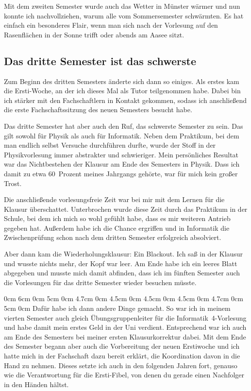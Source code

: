 \begin{multicols*}{2}
Mit dem zweiten Semester wurde auch das Wetter in Münster wärmer und nun konnte ich nachvollziehen, warum alle vom Sommersemester schwärmten. Es hat einfach ein besonderes Flair, wenn man sich nach der Vorlesung auf den Rasenflächen in der Sonne trifft oder abends am Aasee sitzt.

\subsection*{Das dritte Semester ist das schwerste}
Zum Beginn des dritten Semesters änderte sich dann so einiges. Als erstes kam die Ersti-Woche, an der ich dieses Mal als Tutor teilgenommen habe. Dabei bin ich stärker mit den Fachschaftlern in Kontakt gekommen, sodass ich anschließend die erste Fachschaftssitzung des neuen Semesters besucht habe.

Das dritte Semester hat aber auch den Ruf, das schwerste Semester zu sein. Das gilt sowohl für Physik als auch für Informatik. Neben dem Praktikum, bei dem man endlich selbst Versuche durchführen durfte, wurde der Stoff in der Physikvorlesung immer abstrakter und schwieriger. Mein persönliches Resultat war das Nichtbestehen der Klausur am Ende des Semesters in Physik. Dass ich damit zu etwa 60~Prozent meines Jahrgangs gehörte, war für mich kein großer Trost.

Die anschließende vorlesungsfreie Zeit war bei mir mit dem Lernen für die Klausur überschattet. Unterbrochen wurde diese Zeit durch das Praktikum in der Schule, bei dem ich mich so wohl gefühlt habe, dass es mir weiteren Antrieb gegeben hat. Außerdem habe ich die Chance ergriffen und in Informatik die Zwischenprüfung schon nach dem dritten Semester erfolgreich absolviert.

Aber dann kam die Wiederholungsklausur: Ein Blackout. Ich saß in der Klausur und wusste nichts mehr, der Kopf war leer. Am Ende habe ich ein leeres Blatt abgegeben und musste mich damit abfinden, dass ich im fünften Semester auch die Vorlesungen für das dritte Semester wieder besuchen müsste.

0cm \columnwidth
0cm \columnwidth
0cm \columnwidth
0cm \columnwidth
0cm \columnwidth
0cm \columnwidth
0cm \columnwidth
0cm \columnwidth
0cm 6cm
0cm 5cm
0cm 4.7cm
0cm 4.5cm
0cm 4.5cm
0cm 4.5cm
0cm 4.7cm
0cm 5cm
0cm \columnwidth
Dafür habe ich dann andere Dinge gemacht. So war ich in meinem vierten Semester auch gleich Übungsgruppenleiter für die Informatik~4-Vorlesung und habe damit mein erstes Geld in der Uni verdient. Entsprechend war ich auch am Ende des Semesters bei meiner ersten Klausurkorrektur dabei. Mit dem Ende des Semester begann aber auch die Vorbereitung der neuen Erstiwoche und ich hatte mich in der Fachschaft dazu bereit erklärt, die Koordination davon in die Hand zu nehmen. Dieses setzte ich auch in den folgenden Jahren fort, genauso wie die Verantwortung für die Ersti-Fibel, von denen du gerade einen Nachfolger in den Händen hältst.


\end{multicols*}
